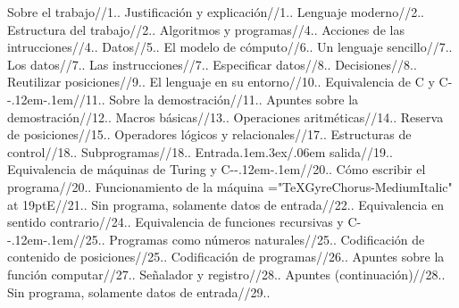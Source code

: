 \entradaindp Sobre el trabajo//1..
\entradainds Justificación y explicación//1..
\entradainds Lenguaje moderno//2..
\entradainds Estructura del trabajo//2..
\entradaindp Algoritmos y programas//4..
\entradainds Acciones de las intrucciones//4..
\entradainds Datos//5..
\entradainds El modelo de cómputo//6..
\entradaindp Un lenguaje sencillo//7..
\entradainds Los datos//7..
\entradainds Las instrucciones//7..
\entradaindt Especificar datos//8..
\entradaindt Decisiones//8..
\entradaindt Reutilizar posiciones//9..
\entradainds El lenguaje en su entorno//10..
\entradaindp Equivalencia de {\def \fcode {\fc }{\fcode C}} y {\def \fcode {\fc }{\fcode \hbox {C-\kern -.12em-\kern .1em}}}//11..
\entradainds Sobre la demostración//11..
\entradainds Apuntes sobre la demostración//12..
\entradaindt Macros básicas//13..
\entradaindt Operaciones aritméticas//14..
\entradaindt Reserva de posiciones//15..
\entradaindt Operadores lógicos y relacionales//17..
\entradaindt Estructuras de control//18..
\entradaindt Subprogramas//18..
\entradaindt Entrada\kern .1em{\fencp \lower .3ex\hbox {/}}\kern .06em salida//19..
\entradaindp Equivalencia de máquinas de Turing y {\def \fcode {\fc }{\fcode \hbox {C-\kern -.12em-\kern .1em}}}//20..
\entradainds Cómo escribir el programa//20..
\entradainds Funcionamiento de la máquina {\font \machine ="TeXGyreChorus-MediumItalic" at 19pt\machine E}//21..
\entradainds Sin programa, solamente datos de entrada//22..
\entradainds Equivalencia en sentido contrario//24..
\entradaindp Equivalencia de funciones recursivas y {\def \fcode {\fc }{\fcode \hbox {C-\kern -.12em-\kern .1em}}}//25..
\entradainds Programas como números naturales//25..
\entradaindt Codificación de contenido de posiciones//25..
\entradaindt Codificación de programas//26..
\entradainds Apuntes sobre la función {\fgabrieleeg computar}//27..
\entradaindt Señalador y registro//28..
\entradaindt Apuntes (continuación)//28..
\entradainds Sin programa, solamente datos de entrada//29..
